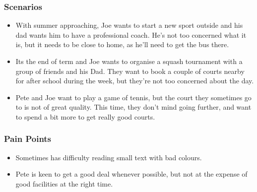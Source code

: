 
\subsubsection*{Scenarios}
\label{ssub:child_scenarios}

\begin{itemize}
	\item With summer approaching, Joe wants to start a new sport outside and
		his dad wants him to have a professional coach. He's not too concerned
		what it is, but it needs to be close to home, as he'll need to get the
		bus there.

	\item Its the end of term and Joe wants to organise a squash tournament
		with a group of friends and his Dad. They want to book a couple of
		courts nearby for after school during the week, but they're not too
		concerned about the day.

	\item Pete and Joe want to play a game of tennis, but the court they
		sometimes go to is not of great quality. This time, they don't mind
		going further, and want to spend a bit more to get really good courts.
\end{itemize}


\subsubsection*{Pain Points}
\label{ssub:child_pain_points}

\begin{itemize}
	\item Sometimes has difficulty reading small text with bad colours.
	\item Pete is keen to get a good deal whenever possible, but not at the
		expense of good facilities at the right time.
\end{itemize}

